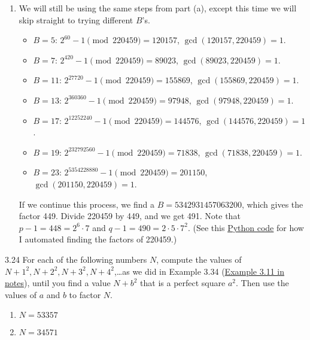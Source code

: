 {\begin{enumerate}
        \item We will still be using the same steps from part (a), except this time we will skip straight to trying different \(B\)'s.
              \begin{itemize}
                  \item \(B = 5\): \(2^{60} - 1 \pmod{220459} = 120157\), \(\gcd(120157, 220459) = 1\).
                  \item \(B = 7\): \(2^{420} - 1 \pmod{220459} = 89023\), \(\gcd(89023, 220459) = 1\).
                  \item \(B = 11\): \(2^{27720} - 1 \pmod{220459} = 155869\), \(\gcd(155869, 220459) = 1\).
                  \item \(B = 13\): \(2^{360360} - 1 \pmod{220459} = 97948\), \(\gcd(97948, 220459) = 1\).
                  \item \(B = 17\): \(2^{12252240} - 1 \pmod{220459} = 144576\), \(\gcd(144576, 220459) = 1\).
                  \item \(B = 19\): \(2^{232792560} - 1 \pmod{220459} = 71838\), \(\gcd(71838, 220459) = 1\).
                  \item \(B = 23\): \(2^{5354228880} - 1 \pmod{220459} = 201150\), \(\gcd(201150, 220459) = 1\).
              \end{itemize}
              If we continue this process, we find a \(B = 5342931457063200\), which gives the factor 449. Divide 220459 by 449, and we get 491. Note that \(p - 1 = 448 = 2^6 \cdot 7\) and \(q - 1 = 490 = 2 \cdot 5 \cdot 7^2\). (See this \hyperlink{pollard's p python}{Python code} for how I automated finding the factors of 220459.)
    \end{enumerate}
}

\begin{exercise}
    {3.24} {For each of the following numbers \(N\), compute the values of \(N + 1^2, N + 2^2, N + 3^2, N + 4^2\),\dots as we did in Example 3.34 (\hyperlink{ex:3.11}{Example 3.11 in notes}), until you find a value \(N + b^2\) that is a perfect square \(a^2\). Then use the values of \(a\) and \(b\) to factor \(N\).}
    \begin{enumerate}
        \item \(N = 53357\)
        \item \(N = 34571\)
    \end{enumerate}
\end{exercise}

